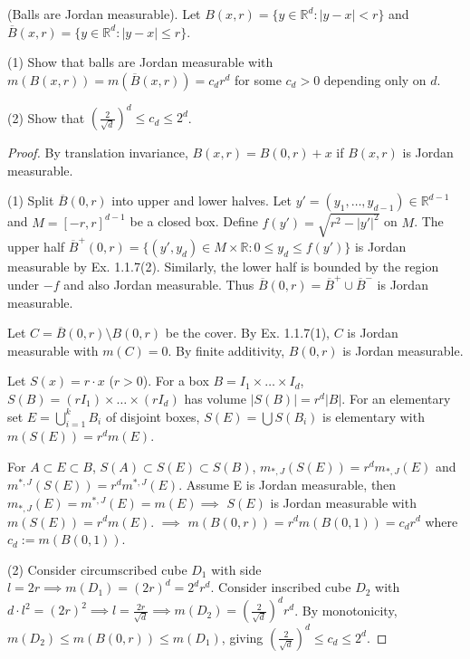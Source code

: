 \begin{exercise}
(Balls are Jordan measurable). Let $B(x,r)=\{y\in\mathbb R^d:|y-x|<r\}$ and $\overline B(x,r)=\{y\in\mathbb R^d:|y-x|\le r\}$.

(1) Show that balls are Jordan measurable with $m(B(x,r))=m(\overline B(x,r))=c_d r^d$ for some $c_d>0$ depending only on $d$.

(2) Show that $\left(\frac{2}{\sqrt d}\right)^d\le c_d\le 2^d$.
\end{exercise}

\begin{proof}
By translation invariance, $B(x,r) = B(0,r) + x$ if $B(x,r)$ is Jordan measurable.

\noindent(1) Split $\overline{B}(0,r)$ into upper and lower halves. Let $y'=(y_1,\dots,y_{d-1}) \in \mathbb{R}^{d-1}$ and $M = [-r,r]^{d-1}$ be a closed box. 
Define $f(y') = \sqrt{r^2 - |y'|^2}$ on $M$. 
The upper half $\overline{B}^+(0,r) = \{(y',y_d) \in M \times \mathbb{R} : 0 \le y_d \le f(y')\}$ is Jordan measurable by Ex. 1.1.7(2). 
Similarly, the lower half is bounded by the region under $-f$ and also Jordan measurable. 
Thus $\overline{B}(0,r) = \overline{B}^+ \cup \overline{B}^-$ is Jordan measurable.

Let $C = \overline{B}(0,r) \setminus B(0,r)$ be the cover. By Ex. 1.1.7(1), $C$ is Jordan measurable with $m(C)=0$. By finite additivity, $B(0,r)$ is Jordan measurable.

Let $S(x) = r \cdot x$ ($r > 0$). For a box $B = I_1 \times \dots \times I_d$, $S(B) = (r I_1) \times \dots \times (r I_d)$ has volume $|S(B)| = r^d |B|$. 
For an elementary set $E = \bigcup_{i=1}^k B_i$ of disjoint boxes, $S(E) = \bigcup S(B_i)$ is elementary with $m(S(E)) = r^d m(E)$.

For $A \subset E \subset B$, $S(A) \subset S(E) \subset S(B)$, $m_{*,J}(S(E)) = r^d m_{*,J}(E)$ and $m^{*,J}(S(E)) = r^d m^{*,J}(E)$. Assume E is Jordan measurable, then 
$m_{*,J}(E) = m^{*,J}(E) = m(E)$$\implies$ $S(E)$ is Jordan measurable with $m(S(E)) = r^d m(E)$. 
$ \implies $ $ m(B(0,r)) = r^d m(B(0,1)) = c_d r^d$ where $c_d := m(B(0,1))$.

(2) Consider circumscribed cube $D_1$ with side $l = 2r \implies m(D_1) = (2r)^d = 2^d r^d$. 
Consider inscribed cube $D_2$ with $d \cdot l^2 = (2r)^2 \implies l = \frac{2r}{\sqrt{d}} \implies m(D_2) = \left(\frac{2}{\sqrt{d}}\right)^d r^d$. 
By monotonicity, $m(D_2) \le m(B(0,r)) \le m(D_1)$, giving $\left(\frac{2}{\sqrt{d}}\right)^d \le c_d \le 2^d$.
\end{proof}